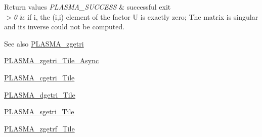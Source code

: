 \begin{DoxyRetVals}{Return values}
{\em P\+L\+A\+S\+M\+A\+\_\+\+S\+U\+C\+C\+E\+S\+S} & successful exit \\
\hline
{\em $>$0} & if i, the (i,i) element of the factor U is exactly zero; The matrix is singular and its inverse could not be computed.\\
\hline
\end{DoxyRetVals}
\begin{DoxySeeAlso}{See also}
\hyperlink{group__PLASMA__Complex64__t_ga96b45d431296d17561924b09a770ce17_ga96b45d431296d17561924b09a770ce17}{P\+L\+A\+S\+M\+A\+\_\+zgetri} 

\hyperlink{group__PLASMA__Complex64__t__Tile__Async_ga128683abcbdcfef6eda7503f0ff45d0d_ga128683abcbdcfef6eda7503f0ff45d0d}{P\+L\+A\+S\+M\+A\+\_\+zgetri\+\_\+\+Tile\+\_\+\+Async} 

\hyperlink{group__PLASMA__Complex32__t__Tile_ga289c70c1c0c2613108b07873535a497b_ga289c70c1c0c2613108b07873535a497b}{P\+L\+A\+S\+M\+A\+\_\+cgetri\+\_\+\+Tile} 

\hyperlink{group__double__Tile_ga7c964736b638ce0fbbb6b679df1af014_ga7c964736b638ce0fbbb6b679df1af014}{P\+L\+A\+S\+M\+A\+\_\+dgetri\+\_\+\+Tile} 

\hyperlink{group__float__Tile_ga6c9b470cb25b778f3a2328e1a7217868_ga6c9b470cb25b778f3a2328e1a7217868}{P\+L\+A\+S\+M\+A\+\_\+sgetri\+\_\+\+Tile} 

\hyperlink{group__PLASMA__Complex64__t__Tile_gabaabd34550ca8a2ba83245af3c44bea0_gabaabd34550ca8a2ba83245af3c44bea0}{P\+L\+A\+S\+M\+A\+\_\+zgetrf\+\_\+\+Tile} 
\end{DoxySeeAlso}
\hypertarget{group__PLASMA__Complex64__t__Tile_gab5c4dcbb8ce3878a5ed028a7485c6484_gab5c4dcbb8ce3878a5ed028a7485c6484}{}
